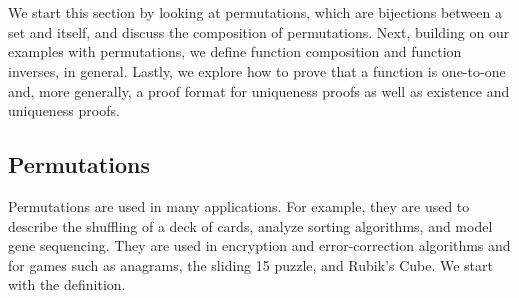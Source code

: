 \section{\secperms}
\label{sec_perms}


We start this section by looking at permutations, which are bijections between a set and itself, and discuss the composition of permutations.  Next, building on our examples with permutations, we define function composition and function inverses, in general. Lastly, we explore how to prove that a function is one-to-one and, more generally, a proof format for uniqueness proofs as well as existence and uniqueness proofs.

\newcommand{\subperms}{Permutations}
\subsection{\subperms}
\label{sub_permutations}

Permutations are used in many applications. For example, they are used to describe the shuffling of a deck of cards, analyze sorting algorithms, and model gene sequencing.  They are used in encryption and error-correction algorithms and for games such as anagrams, the sliding 15 puzzle, and Rubik's Cube{\texttrademark}.  We start with the definition.


